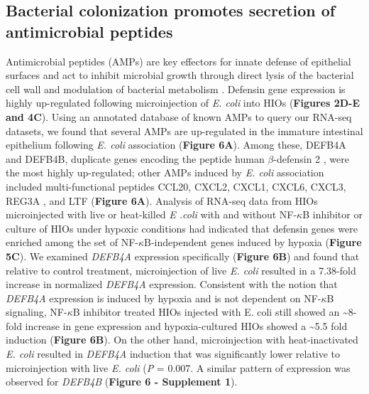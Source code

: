 \documentclass[9pt,lineo]{elife}
\begin{document}
\subsection*{{\bfseries\sffamily } Bacterial colonization promotes secretion of antimicrobial peptides}
\label{sec:orgheadline8}
Antimicrobial peptides (AMPs) are key effectors for innate defense of epithelial surfaces \citep{Muniz:2012} and act to inhibit microbial growth through direct lysis of the bacterial cell wall and modulation of bacterial metabolism  \citep{Ganz:2003,Bevins:2011,O'Neil:2003,Vora:2004,Brogden:2005}. Defensin gene expression is highly up-regulated following microinjection of \emph{E. coli} into HIOs (\textbf{Figures 2D-E and 4C}). Using an annotated database of known AMPs \citep{Wang:2016} to query our RNA-seq datasets, we found that several AMPs are up-regulated in the immature intestinal epithelium following \emph{E. coli} association (\textbf{Figure 6A}). Among these, DEFB4A and DEFB4B, duplicate genes encoding the peptide human \(\beta\)-defensin 2 \citep{Harder:1997}, were the most highly up-regulated; other AMPs induced by \emph{E. coli} association included multi-functional peptides CCL20, CXCL2, CXCL1, CXCL6, CXCL3, REG3A \citep{Cash:2006}, and LTF (\textbf{Figure 6A}). Analysis of RNA-seq data from HIOs microinjected with live or heat-killed \emph{E .coli} with and without NF-\(\kappa\)B inhibitor or culture of HIOs under hypoxic conditions had indicated that defensin genes were enriched among the set of NF-\(\kappa\)B-independent genes induced by hypoxia (\textbf{Figure 5C}). We examined \emph{DEFB4A} expression specifically (\textbf{Figure 6B}) and found that relative to control treatment, microinjection of live \emph{E. coli} resulted in a 7.38-fold increase in normalized \emph{DEFB4A} expression. Consistent with the notion that \emph{DEFB4A} expression is induced by hypoxia and is not dependent on NF-\(\kappa\)B signaling, NF-\(\kappa\)B inhibitor treated HIOs injected with E. coli still showed an \textasciitilde{}8-fold increase in gene expression and hypoxia-cultured HIOs showed a \textasciitilde{}5.5 fold induction (\textbf{Figure 6B}). On the other hand, microinjection with heat-inactivated \emph{E. coli} resulted in \emph{DEFB4A} induction that was significantly lower relative to microinjection with live \emph{E. coli} (\emph{P} = 0.007. A similar pattern of expression was observed for \emph{DEFB4B} (\textbf{Figure 6 - Supplement 1}).
\end{document}
